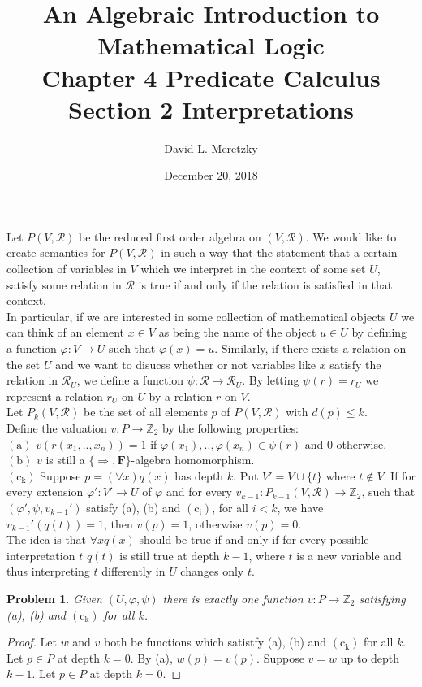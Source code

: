 \documentclass{article}
\title{ \vspace{-10ex} %
An Algebraic Introduction to Mathematical Logic\\
Chapter 4 Predicate Calculus \\
Section 2 Interpretations \\
}
\author{David L. Meretzky
}
\date{%
December 20, 2018
}
\theoremstyle{problemstyle}
\newtheorem{problem}{Problem}
\theoremstyle{lemmastyle}
\theoremstyle{theoremstyle}
\theoremstyle{problemstyle}
\begin{document}
\maketitle

Let $P(V,\mathscr{R})$ be the reduced first order algebra on $(V,\mathscr{R})$. We would like to create semantics for $P(V,\mathscr{R})$ in such a way that the statement that a certain collection of variables in $V$ which we interpret in the context of some set $U$, satisfy some relation in $\mathscr{R}$ is true if and only if the relation is satisfied in that context.\\

In particular, if we are interested in some collection of mathematical objects $U$ we can think of an element $x \in V$ as being the name of the object $u \in U$ by defining a function $\varphi:V \rightarrow U$ such that $\varphi(x) = u$. Similarly, if there exists a relation on the set $U$ and we want to disucss whether or not variables like $x$ satisfy the relation in $\mathscr{R}_U$, we define a function $\psi:\mathscr{R} \rightarrow \mathscr{R}_U$. By letting $\psi(r) = r_U$ we represent a relation $r_U$ on $U$ by a relation $r$ on $V$.\\

Let $P_k(V,\mathscr{R})$ be the set of all elements $p$ of $P(V,\mathscr{R})$ with $d(p) \leq k$. \\

Define the valuation $v:P \rightarrow \mathbb{Z}_2$ by the following properties:\\

$(\text{a})$ $v(r(x_1,..,x_n)) = 1$ if $\varphi(x_1),..,\varphi(x_n) \in \psi(r)$ and $0$ otherwise.\\
$(\text{b})$ $v$ is still a $\{\Rightarrow, \textbf{F}\}$-algebra homomorphism.\\
$(\text{c}_\text{k})$ Suppose $p = (\forall x)q(x)$ has depth $k$. Put $V' = V \cup \{t\}$ where $t \notin V$. If for every extension $\varphi':V' \rightarrow U$ of $\varphi$ and for every $v_{k-1}:P_{k-1}(V, \mathscr{R})\rightarrow \mathbb{Z}_2$, such that $(\varphi',\psi,v_{k-1}')$ satisfy (a), (b) and $(\text{c}_\text{i})$, for all $i < k$, we have $v_{k-1}'(q(t))=1$, then $v(p) = 1$, otherwise $v(p) = 0$.\\  

The idea is that $\forall x q(x)$ should be true if and only if for every possible interpretation $t$ $q(t)$ is still true at depth $k-1$, where $t$ is a new variable and thus interpreting $t$ differently in $U$ changes only $t$. 

\begin{problem}
Given $(U, \varphi, \psi)$ there is exactly one function $v:P \rightarrow \mathbb{Z}_2$ satisfying (a), (b) and $(\text{c}_\text{k})$ for all $k$. 
\end{problem}

\begin{proof}
Let $w$ and $v$ both be functions which satistfy (a), (b) and $(\text{c}_\text{k})$ for all $k$. Let $p \in P$ at depth $k=0$. By (a), $w(p) = v(p)$. Suppose $v = w$ up to depth $k-1$. Let $p \in P$ at depth $k=0$. 
\end{proof}
\end{document}

